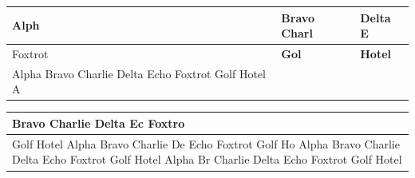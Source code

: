 \documentclass[11pt,a4paper]{article}
\begin{document}
\begin{table}[h]
\begin{tabular}{|l|l|l|}
\hline
Alph & Bravo Charl & Delta E \\ \hline
Foxtrot  & \textbf{Gol} & \textbf{Hotel}  \\ \hline
Alpha Bravo  Charlie Delta Echo Foxtrot Golf Hotel A &  &  \\ \hline
\end{tabular}
\end{table}

\begin{table}[h]
\begin{tabular}{|l|}
\hline
Bravo Charlie Delta Ec  Foxtro \\ \hline
Golf Hotel Alpha Bravo Charlie De  Echo Foxtrot Golf Ho  Alpha Bravo Charlie Delta Echo Foxtrot  Golf Hotel Alpha Br  Charlie Delta Echo Foxtrot Golf Hotel  \\ \hline
\end{tabular}
\end{table}
\end{document}
